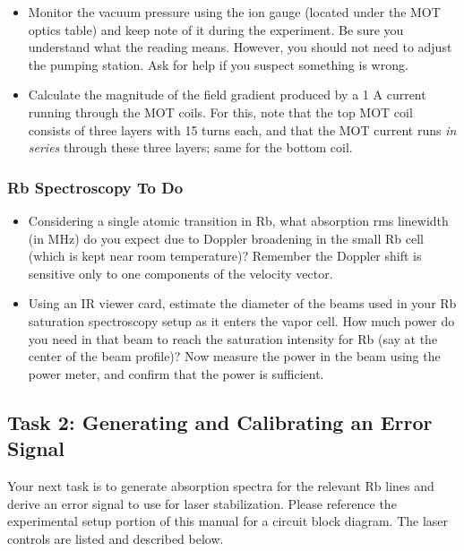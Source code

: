 \documentclass{../lab}
\begin{document}
\begin{itemize}
    \item Monitor the vacuum pressure using the ion gauge (located under the MOT optics table) and keep note of it during the experiment. Be sure you understand what the reading means. However, you should not need to adjust the pumping station. Ask for help if you suspect something is wrong.

    \item Calculate the magnitude of the field gradient produced by a 1 A current running through the MOT coils. For this, note that the top MOT coil consists of three layers with 15 turns each, and that the MOT current runs \emph{in series} through these three layers; same for the bottom coil.
\end{itemize}

\subsubsection{Rb Spectroscopy To Do}

\begin{itemize}
    \item Considering a single atomic transition in Rb, what absorption rms linewidth (in MHz) do you expect due to Doppler broadening in the small Rb cell (which is kept near room temperature)? Remember the Doppler shift is sensitive only to one components of the velocity vector.

    \item Using an IR viewer card, estimate the diameter of the beams used in your Rb saturation spectroscopy setup as it enters the vapor cell. How much power do you need in that beam to reach the saturation intensity for Rb (say at the center of the beam profile)? Now measure the power in the beam using the power meter, and confirm that the power is sufficient.
\end{itemize}

\subsection{Task 2: Generating and Calibrating an Error Signal}

Your next task is to generate absorption spectra for the relevant Rb lines and derive an error signal to use for laser stabilization. Please reference the experimental setup portion of this manual for a circuit block diagram. The laser controls are listed and described below.
\end{document}
